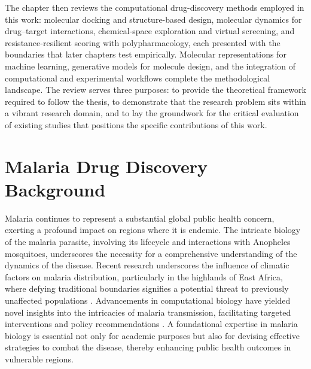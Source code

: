 The chapter then reviews the computational drug-discovery methods employed in this work: molecular docking and structure-based design, molecular dynamics for drug--target interactions, chemical-space exploration and virtual screening, and resistance-resilient scoring with polypharmacology, each presented with the boundaries that later chapters test empirically. Molecular representations for machine learning, generative models for molecule design, and the integration of computational and experimental workflows complete the methodological landscape. The review serves three purposes: to provide the theoretical framework required to follow the thesis, to demonstrate that the research problem sits within a vibrant research domain, and to lay the groundwork for the critical evaluation of existing studies that positions the specific contributions of this work.

\section{Malaria Drug Discovery Background}
Malaria continues to represent a substantial global public health concern, exerting a profound impact on regions where it is endemic. The intricate biology of the malaria parasite, involving its lifecycle and interactions with Anopheles mosquitoes, underscores the necessity for a comprehensive understanding of the dynamics of the disease. Recent research underscores the influence of climatic factors on malaria distribution, particularly in the highlands of East Africa, where defying traditional boundaries signifies a potential threat to previously unaffected populations \cite{Chaves2010}. Advancements in computational biology have yielded novel insights into the intricacies of malaria transmission, facilitating targeted interventions and policy recommendations \cite{Chasapi2019}. A foundational expertise in malaria biology is essential not only for academic purposes but also for devising effective strategies to combat the disease, thereby enhancing public health outcomes in vulnerable regions.


